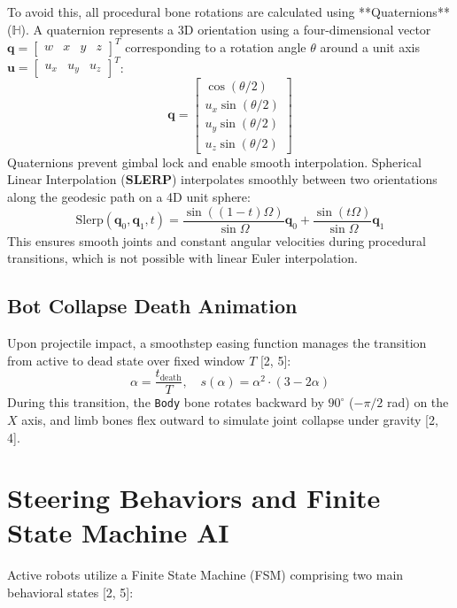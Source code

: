 \documentclass[11pt,a4paper,oneside]{article}
\begin{document}
To avoid this, all procedural bone rotations are calculated using **Quaternions** ($\mathbb{H}$). A quaternion represents a 3D orientation using a four-dimensional vector $\mathbf{q} = \begin{bmatrix} w & x & y & z \end{bmatrix}^T$ corresponding to a rotation angle $\theta$ around a unit axis $\mathbf{u} = \begin{bmatrix} u_x & u_y & u_z \end{bmatrix}^T$:
\begin{equation}
    \mathbf{q} = \begin{bmatrix} \cos(\theta/2) \\ u_x \sin(\theta/2) \\ u_y \sin(\theta/2) \\ u_z \sin(\theta/2) \end{bmatrix}
\end{equation}
Quaternions prevent gimbal lock and enable smooth interpolation. Spherical Linear Interpolation (\textbf{SLERP}) interpolates smoothly between two orientations along the geodesic path on a 4D unit sphere:
\begin{equation}
    \text{Slerp}(\mathbf{q}_0, \mathbf{q}_1, t) = \frac{\sin((1-t)\Omega)}{\sin\Omega}\mathbf{q}_0 + \frac{\sin(t\Omega)}{\sin\Omega}\mathbf{q}_1
\end{equation}
This ensures smooth joints and constant angular velocities during procedural transitions, which is not possible with linear Euler interpolation.

\subsection{Bot Collapse Death Animation}
Upon projectile impact, a smoothstep easing function manages the transition from active to dead state over fixed window $T$ [2, 5]:
\begin{equation}
    \alpha = \frac{t_{\text{death}}}{T}, \quad s(\alpha) = \alpha^2 \cdot (3 - 2\alpha)
\end{equation}
During this transition, the \texttt{Body} bone rotates backward by $90^\circ$ ($-\pi/2$ rad) on the $X$ axis, and limb bones flex outward to simulate joint collapse under gravity [2, 4].

\newpage
\section{Steering Behaviors and Finite State Machine AI}
Active robots utilize a Finite State Machine (FSM) comprising two main behavioral states [2, 5]:
\end{document}
